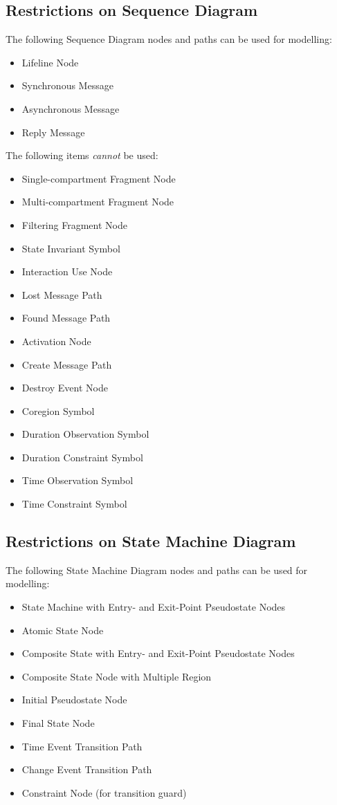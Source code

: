 \subsection{Restrictions on Sequence Diagram}

The following Sequence Diagram nodes and paths can be used for
modelling:
\begin{itemize}
\item Lifeline Node
\item Synchronous Message
\item Asynchronous Message
\item Reply Message
\end{itemize}

The following items \emph{cannot} be used:
\begin{itemize}
\item Single-compartment Fragment Node
\item Multi-compartment Fragment Node
\item Filtering Fragment Node
\item State Invariant Symbol
\item Interaction Use Node
\item Lost Message Path
\item Found Message Path
\item Activation Node
\item Create Message Path
\item Destroy Event Node
\item Coregion Symbol
\item Duration Observation Symbol
\item Duration Constraint Symbol
\item Time Observation Symbol
\item Time Constraint Symbol
\end{itemize}

\subsection{Restrictions on State Machine Diagram}

The following State Machine Diagram nodes and paths can be used for
modelling:
\begin{itemize}
\item State Machine with Entry- and Exit-Point Pseudostate Nodes
\item Atomic State Node
\item Composite State with Entry- and Exit-Point Pseudostate Nodes
\item Composite State Node with Multiple Region
\item Initial Pseudostate Node
\item Final State Node
\item Time Event Transition Path
\item Change Event Transition Path
\item Constraint Node (for transition guard)
\end{itemize}

